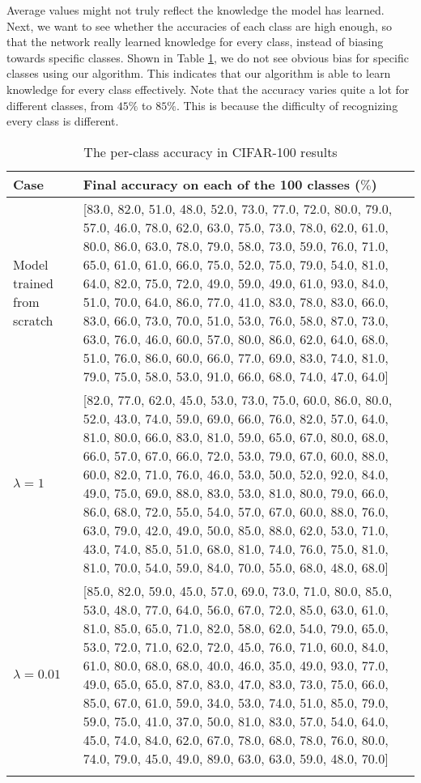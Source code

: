 Average values might not truly reflect the knowledge the model has learned. Next, we want to see whether the accuracies of each class are high enough, so that the network really learned knowledge for every class, instead of biasing towards specific classes. Shown in Table \ref{tab:cifar100}, we do not see obvious bias for specific classes using our algorithm. This indicates that our algorithm is able to learn knowledge for every class effectively. Note that the accuracy varies quite a lot for different classes, from $45\%$ to $85\%$. This is because the difficulty of recognizing every class is different.
\begin{table}[!hpb]
	\centering
	\caption[The per-class accuracy in CIFAR-100 results]
	{The per-class accuracy in CIFAR-100 results}
	\label{tab:firstone}
	\begin{tabular}{@{}lp{10cm}@{}} \toprule
		Case &  Final accuracy on each of the 100 classes ($\%$)\\ \midrule
		Model trained from scratch  &[83.0, 82.0, 51.0, 48.0, 52.0, 73.0, 77.0, 72.0, 80.0, 79.0, 57.0, 46.0, 78.0, 62.0, 63.0, 75.0, 73.0, 78.0, 62.0, 61.0, 80.0, 86.0, 63.0, 78.0, 79.0, 58.0, 73.0, 59.0, 76.0, 71.0, 65.0, 61.0, 61.0, 66.0,
		75.0, 52.0, 75.0, 79.0, 54.0, 81.0, 64.0, 82.0, 75.0, 72.0, 49.0, 59.0, 49.0, 61.0, 93.0, 84.0, 51.0, 70.0, 64.0, 86.0, 77.0, 41.0, 83.0, 78.0, 83.0, 66.0, 83.0, 66.0, 73.0, 70.0, 51.0, 53.0, 76.0, 58.0,
		87.0, 73.0, 63.0, 76.0, 46.0, 60.0, 57.0, 80.0, 86.0, 62.0, 64.0, 68.0, 51.0, 76.0, 86.0, 60.0, 66.0, 77.0, 69.0, 83.0, 74.0, 81.0, 79.0, 75.0, 58.0, 53.0, 91.0, 66.0, 68.0, 74.0, 47.0, 64.0]\\
		$\lambda=1$  &[82.0, 77.0, 62.0, 45.0, 53.0, 73.0, 75.0, 60.0, 86.0, 80.0, 52.0, 43.0, 74.0, 59.0, 69.0, 66.0, 76.0, 82.0, 57.0, 64.0, 81.0, 80.0, 66.0, 83.0, 81.0, 59.0, 65.0, 67.0, 80.0, 68.0, 66.0, 57.0, 67.0, 66.0, 72.0, 53.0, 79.0, 67.0, 60.0, 88.0, 60.0, 82.0, 71.0, 76.0, 46.0, 53.0, 50.0, 52.0, 92.0, 84.0, 49.0, 75.0, 69.0, 88.0, 83.0, 53.0, 81.0, 80.0, 79.0, 66.0, 86.0, 68.0, 72.0, 55.0, 54.0, 57.0, 67.0, 60.0, 88.0, 76.0, 63.0, 79.0, 42.0, 49.0, 50.0, 85.0, 88.0, 62.0, 53.0, 71.0, 43.0, 74.0, 85.0, 51.0, 68.0, 81.0, 74.0, 76.0, 75.0, 81.0, 81.0, 70.0, 54.0, 59.0, 84.0, 70.0, 55.0, 68.0, 48.0, 68.0]
		\\
		$\lambda=0.01$  & [85.0, 82.0, 59.0, 45.0, 57.0, 69.0, 73.0, 71.0, 80.0, 85.0, 53.0, 48.0, 77.0, 64.0, 56.0, 67.0, 72.0, 85.0, 63.0, 61.0, 81.0, 85.0, 65.0, 71.0, 82.0, 58.0, 62.0, 54.0, 79.0, 65.0, 53.0, 72.0, 71.0, 62.0, 72.0, 45.0, 76.0, 71.0, 60.0, 84.0, 61.0, 80.0, 68.0, 68.0, 40.0, 46.0, 35.0, 49.0, 93.0, 77.0, 49.0, 65.0, 65.0, 87.0, 83.0, 47.0, 83.0, 73.0, 75.0, 66.0, 85.0, 67.0, 61.0, 59.0, 34.0, 53.0, 74.0, 51.0, 85.0, 79.0, 59.0, 75.0, 41.0, 37.0, 50.0, 81.0, 83.0, 57.0, 54.0, 64.0, 45.0, 74.0, 84.0, 62.0, 67.0, 78.0, 68.0, 78.0, 76.0, 80.0, 74.0, 79.0, 45.0, 49.0, 89.0, 63.0, 63.0, 59.0, 48.0, 70.0]\\ \bottomrule
\label{tab:cifar100}
	\end{tabular}
\end{table}

